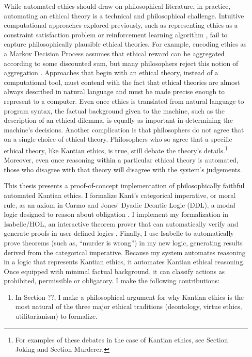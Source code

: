 \begin{isabellebody}
\begin{isamarkuptext}
While automated ethics should draw on philosophical literature, in practice, automating an ethical 
theory is a technical and philosophical challenge. Intuitive computational approaches explored 
previously, such as representing ethics as a constraint satisfaction problem \citep{csp} or reinforcement 
learning algorithm \citep{util1}, fail to capture philosophically plausible ethical theories. For 
example, encoding ethics as a Markov Decision Process assumes that ethical reward can be aggregated 
according to some discounted sum, but many philosophers reject this notion of aggregation \citep{consequentialismsep}. 
Approaches that begin with an ethical theory, instead of a computational tool, must contend with the 
fact that ethical theories are almost always described in natural language and must be made
precise enough to represent to a computer. Even once ethics is translated from natural 
language to program syntax, the factual background given to the machine, such as the description of 
an ethical dilemma, is equally as important in determining the machine's decisions. Another complication
is that philosophers do not agree that on a single choice of ethical theory. Philosophers who
so agree that a specific ethical theory, like Kantian ethics, is true, still debate the theory's 
details.\footnote{For examples of these debates in the case of Kantian ethics, see Section Joking
and Section Murderer.} Moreover, even once reasoning within a 
particular ethical theory is automated, those who disagree with that theory will disagree with the 
system's judgements.

This thesis presents a proof-of-concept implementation of philosophically faithful automated Kantian ethics. 
I formalize Kant's categorical imperative, or moral rule, as an axiom 
in Carmo and Jones' Dyadic Deontic Logic (DDL), a modal logic designed to reason about 
obligation \citep{CJDDL}. I implement my formalization in Isabelle/HOL, an interactive theorem prover 
that can automatically verify and generate proofs in user-defined logics \citep{isabelle}. Finally, 
I use Isabelle to automatically prove theorems (such as, ``murder is wrong'') in my new logic, 
generating results derived from the categorical imperative. Because my system automates reasoning in 
a logic that represents Kantian ethics, it automates Kantian ethical reasoning. Once equipped with 
minimal factual background, it can classify actions as prohibited, permissible or obligatory. I 
make the following contributions:%
\end{isamarkuptext}\isamarkuptrue%
%
\begin{isamarkuptext}%
\begin{enumerate}
\item In Section ??, I make a philosophical argument for why Kantian ethics is the most natural of the three major
ethical traditions (deontology, virtue ethics, utilitarianism) to formalize.


\end{enumerate}
\end{isamarkuptext}
\end{isabellebody}
